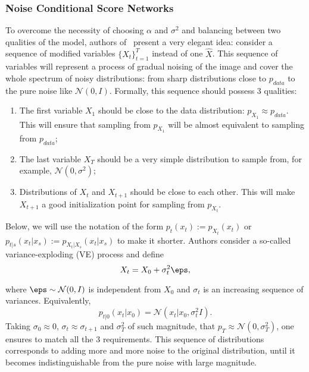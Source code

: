 \subsubsection{Noise Conditional Score Networks}
To overcome the necessity of choosing $\alpha$ and $\sigma^2$ and balancing between two qualities of the model, authors of~\cite{song2019generative} present a very elegant idea: consider a sequence of modified variables $\{X_t\}_{t = 1}^{T}$ instead of one $\hat{X}$. This sequence of variables will represent a process of gradual noising of the image and cover the whole spectrum of noisy distributions: from sharp distributions close to $p_{data}$ to the pure noise like $\mathcal{N}(0, I)$. Formally, this sequence should possess 3 qualities:
\begin{enumerate}
    \item The first variable $X_1$ should be close to the data distribution: $p_{X_1} \approx p_{data}$. This will ensure that sampling from $p_{X_1}$ will be almost equivalent to sampling from $p_{data}$;
    \item The last variable $X_T$ should be a very simple distribution to sample from, for example, $\mathcal{N}(0, \sigma^2)$;
    \item Distributions of $X_t$ and $X_{t + 1}$ should be close to each other. This will make $X_{t + 1}$ a good initialization point for sampling from $p_{X_t}$.
\end{enumerate}

Below, we will use the notation of the form $p_t(x_t) := p_{X_t}(x_t)$ or $p_{t | s}(x_t | x_s) := p_{X_t | X_s}(x_t | x_s)$ to make it shorter. Authors consider a so-called variance-exploding (VE) process and define
\begin{equation}\label{eq:ve_process}
    X_t = X_0 + \sigma^2_t \eps,    
\end{equation}

where $\eps \sim \mathcal{N}(0, I)$ is independent from $X_0$ and $\sigma_t$ is an increasing sequence of variances. Equivalently,
\[
    p_{t | 0}(x_t | x_0) = \mathcal{N}(x_t | x_0, \sigma_t^2 I).
\]
Taking $\sigma_0 \approx 0$, $\sigma_{t} \approx \sigma_{t + 1}$ and $\sigma_{T}^2$ of such magnitude, that $p_{T} \approx \mathcal{N}(0, \sigma_T^2)$, one ensures to match all the 3 requirements. This sequence of distributions corresponds to adding more and more noise to the original distribution, until it becomes indistinguishable from the pure noise with large magnitude.

